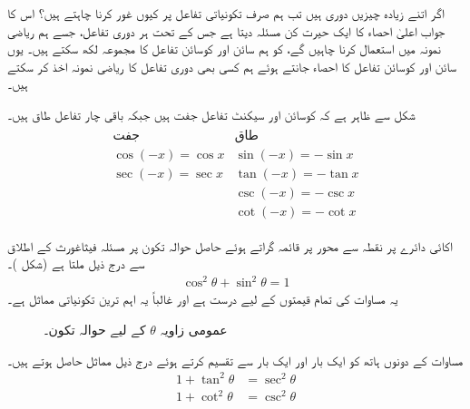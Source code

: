 اگر اتنے زیادہ چیزیں دوری ہیں تب ہم صرف تکونیاتی تفاعل پر کیوں غور کرنا چاہتے ہیں؟ اس کا جواب اعلیٰ احصاء کا ایک حیرت کن مسئلہ دیتا ہے جس کے تحت ہر دوری تفاعل، جسے ہم ریاضی نمونہ میں استعمال کرنا چاہیں گے، کو ہم سائن اور کوسائن تفاعل کا مجموعہ لکھ سکتے ہیں۔  یوں سائن اور کوسائن تفاعل کا احصاء جانتے ہوئے ہم کسی بھی دوری تفاعل کا ریاضی نمونہ اخذ کر سکتے ہیں۔

شکل  سے ظاہر ہے کہ کوسائن اور سیکنٹ تفاعل جفت ہیں جبکہ باقی چار تفاعل طاق ہیں۔
\begin{align*}
\begin{array}{ll}
\text{جفت}&\text{طاق}\\
\hline
\cos(-x)=\cos x &\sin(-x)=-\sin x\\
\sec(-x)=\sec x&\tan(-x)=-\tan x\\
&\csc(-x)=-\csc x\\
&\cot(-x)=-\cot x
\end{array}
\end{align*}

اکائی دائرے پر نقطہ  سے محور  پر قائمہ گراتے ہوئے حاصل حوالہ تکون پر مسئلہ فیثاغورث کے اطلاق سے درج ذیل ملتا ہے (شکل )۔
\begin{align}\label{مساوات_ابتدا_مماثل_الف}
\cos^2\theta +\sin^2\theta=1
\end{align}
یہ مساوات  کی تمام قیمتوں  کے لیے درست ہے اور غالباً  یہ اہم ترین تکونیاتی مماثل ہے۔
\begin{figure}
\centering
{}
\caption{عمومی زاویہ $\theta$ کے لیے حوالہ تکون۔}
\label{شکل_ابتدا_عمومی_زاویہ_تکون}
\end{figure}

مساوات  کے دونوں ہاتھ کو ایک بار  اور ایک بار  سے تقسیم کرتے ہوئے درج ذیل مماثل حاصل ہوتے ہیں۔
\begin{align*}
1+\tan^2\theta&=\sec^2\theta\\
1+\cot^2\theta&=\csc^2\theta
\end{align*}

